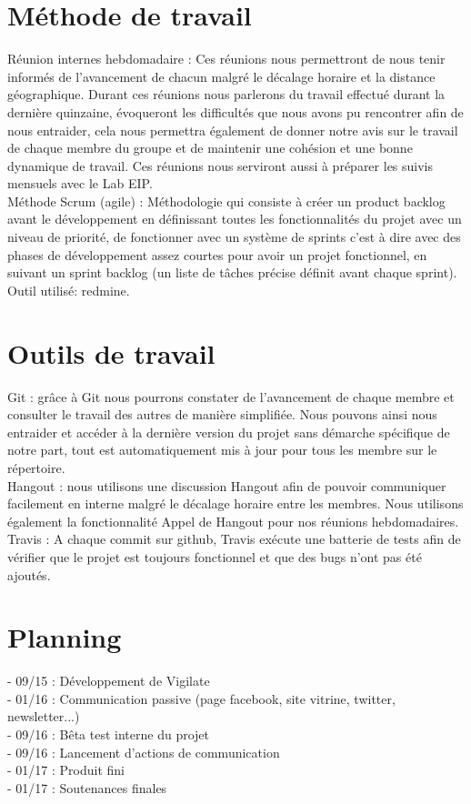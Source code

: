 \section{Méthode de travail}
Réunion internes hebdomadaire : Ces réunions nous permettront de nous tenir informés de l’avancement de chacun malgré le décalage horaire et la distance géographique. Durant ces réunions nous parlerons du travail effectué durant la dernière quinzaine, évoqueront les difficultés que nous avons pu rencontrer afin de nous entraider, cela nous permettra également de donner notre avis sur le travail de chaque membre du groupe et de maintenir une cohésion et une bonne dynamique de travail. Ces réunions nous serviront aussi à préparer les suivis mensuels avec le Lab EIP.\\
Méthode Scrum (agile) : Méthodologie qui consiste à créer un product backlog avant le développement en définissant toutes les fonctionnalités du projet avec un niveau de priorité, de fonctionner avec un système de sprints c’est à dire avec des phases de développement assez courtes pour avoir un projet fonctionnel, en suivant un sprint backlog (un liste de tâches précise définit avant chaque sprint). Outil utilisé: redmine.\\

\section{Outils de travail}
Git : grâce à Git nous pourrons constater de l’avancement de chaque membre et consulter le travail des autres de manière simplifiée. Nous pouvons ainsi nous entraider et accéder à la dernière version du projet sans démarche spécifique de notre part, tout est automatiquement mis à jour pour tous les membre sur le répertoire.\\
Hangout : nous utilisons une discussion Hangout afin de pouvoir communiquer facilement en interne malgré le décalage horaire entre les membres. Nous utilisons également la fonctionnalité Appel de Hangout pour nos réunions hebdomadaires.\\
Travis : A chaque commit sur github, Travis exécute une batterie de tests afin de vérifier que le projet est toujours fonctionnel et que des bugs n’ont pas été ajoutés.\\

\section{Planning}
- 09/15 : Développement de Vigilate\\
- 01/16 : Communication passive (page facebook, site vitrine, twitter, newsletter...)\\
- 09/16 : Bêta test interne du projet\\
- 09/16 : Lancement d’actions de communication\\
- 01/17 : Produit fini\\
- 01/17 : Soutenances finales\\

